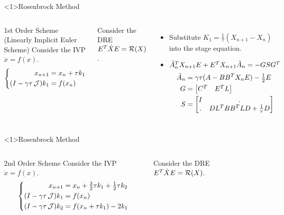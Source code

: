 \begin{frame}<1>{Rosenbrock Method \parencite{Mena2007,Lang2017}}
\begin{columns}
  \begin{block}{1st Order Scheme (Linearly Implicit Euler Scheme)}
    Consider the IVP $\dot x = f(x)$.
    \begin{equation*}
    \left\{
    \begin{aligned}
      x_{n+1} &= x_n + \tau k_1 \\
      (I - \gamma\tau \operatorname{\mathcal J}) k_1 &= f(x_n)
    \end{aligned}
    \right.
    \end{equation*}
  \end{block}
  Consider the DRE $E^T \dot X E = \operatorname{\mathcal R}(X)$.
  \begin{itemize}
    \item
      Substitute $K_1 = \frac{1}{\tau}(X_{n+1} - X_n)$ into the stage equation.
    \item
      $\tilde A_n^T X_{n+1} E + E^T X_{n+1} \tilde A_n = - GSG^T$
      \begin{align*}
        \tilde A_n &= \gamma\tau(A-BB^T X_n E) - \tfrac{1}{2} E
        \\
        G &= \begin{bmatrix}
          C^T & E^T L
        \end{bmatrix}
        \\
        S &= \begin{bmatrix}
          I & . \\
          . & DL^T BB^T LD + \tfrac{1}{\tau} D
        \end{bmatrix}
      \end{align*}
  \end{itemize}
  \vfill
{}
\end{columns}
\end{frame}

\begin{frame}<1>{Rosenbrock Method \parencite{Mena2007,Lang2017}}
\begin{columns}
  \begin{block}{2nd Order Scheme \parencite{Verwer1999}}
    Consider the IVP $\dot x = f(x)$.
    \begin{equation*}
    \left\{
    \begin{aligned}
      x_{n+1} &= x_n + \tfrac{3}{2} \tau k_1 + \tfrac{1}{2} \tau k_2 \\
      (I - \gamma\tau \operatorname{\mathcal J}) k_1 &= f(x_n) \\
      (I - \gamma\tau \operatorname{\mathcal J}) k_2 &= f(x_n + \tau k_1) - 2k_1
    \end{aligned}
    \right.
    \end{equation*}
  \end{block}
  Consider the DRE $E^T \dot X E = \operatorname{\mathcal R}(X)$.
\end{columns}
\end{frame}
